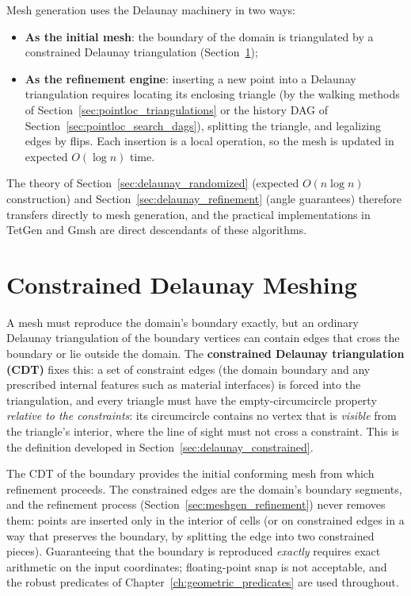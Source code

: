 Mesh generation uses the Delaunay machinery in two ways:
\begin{itemize}
  \item \textbf{As the initial mesh}: the boundary of the domain is
    triangulated by a constrained Delaunay triangulation
    (Section~\ref{sec:meshgen_constrained});
  \item \textbf{As the refinement engine}: inserting a new point into a
    Delaunay triangulation requires locating its enclosing triangle (by the
    walking methods of Section~\ref{sec:pointloc_triangulations} or the
    history DAG of Section~\ref{sec:pointloc_search_dags}), splitting the
    triangle, and legalizing edges by flips. Each insertion is a local
    operation, so the mesh is updated in expected $O(\log n)$ time.
\end{itemize}
The theory of Section~\ref{sec:delaunay_randomized} (expected $O(n\log n)$
construction) and Section~\ref{sec:delaunay_refinement} (angle guarantees)
therefore transfers directly to mesh generation, and the practical
implementations in TetGen \cite{si2015} and Gmsh \cite{geuzaine2009} are
direct descendants of these algorithms.

\section{Constrained Delaunay Meshing}
\label{sec:meshgen_constrained}

A mesh must reproduce the domain's boundary exactly, but an ordinary
Delaunay triangulation of the boundary vertices can contain edges that
cross the boundary or lie outside the domain. The \textbf{constrained
Delaunay triangulation (CDT)}
fixes this: a set of constraint edges (the domain boundary and any
prescribed internal features such as material interfaces) is forced into
the triangulation, and every triangle must have the empty-circumcircle
property \emph{relative to the constraints}: its circumcircle contains no
vertex that is \emph{visible} from the triangle's interior, where the line
of sight must not cross a constraint. This is the definition developed in
Section~\ref{sec:delaunay_constrained}.

The CDT of the boundary provides the initial conforming mesh from which
refinement proceeds. The constrained edges are the domain's boundary
segments, and the refinement process (Section~\ref{sec:meshgen_refinement})
never removes them: points are inserted only in the interior of cells (or
on constrained edges in a way that preserves the boundary, by splitting the
edge into two constrained pieces). Guaranteeing that the boundary is
reproduced \emph{exactly} requires exact arithmetic on the input
coordinates; floating-point snap is not acceptable, and the robust
predicates of Chapter~\ref{ch:geometric_predicates} are used throughout.


